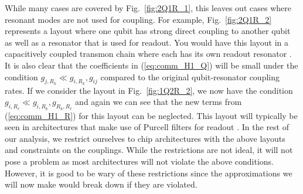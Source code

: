 While many cases are covered by Fig.\ \ref{fig:2Q1R_1}, this leaves out cases where resonant modes are not used for coupling. For example, Fig.\ \ref{fig:2Q1R_2} represents a layout where one qubit has strong direct coupling to another qubit as well as a resonator that is used for readout. You would have this layout in a capacitively coupled transmon chain where each has its own readout resonator \cite{Barends2016}. It is also clear that the coefficients in (\ref{eq:comm_H1_Q}) will be small under the condition $g_{j,R_k} \ll g_{i,R_k},g_{ij}$ compared to the original qubit-resonator coupling rates. If we consider the layout in Fig.\ \ref{fig:1Q2R_2}, we now have the condition $g_{i,R_\ell} \ll g_{i,R_k},g_{R_k,R_\ell}$ and again we can see that the new terms from (\ref{eq:comm_H1_R}) for this layout can be neglected. This layout will typically be seen in architectures that make use of Purcell filters for readout \cite{rapid_multiplexed_readout,karamlou2023probing}. In the rest of our analysis, we restrict ourselves to chip architectures with the above layouts and constraints on the couplings. While the restrictions are not ideal, it will not pose a problem as most architectures will not violate the above conditions. However, it is good to be wary of these restrictions since the approximations we will now make would break down if they are violated.

